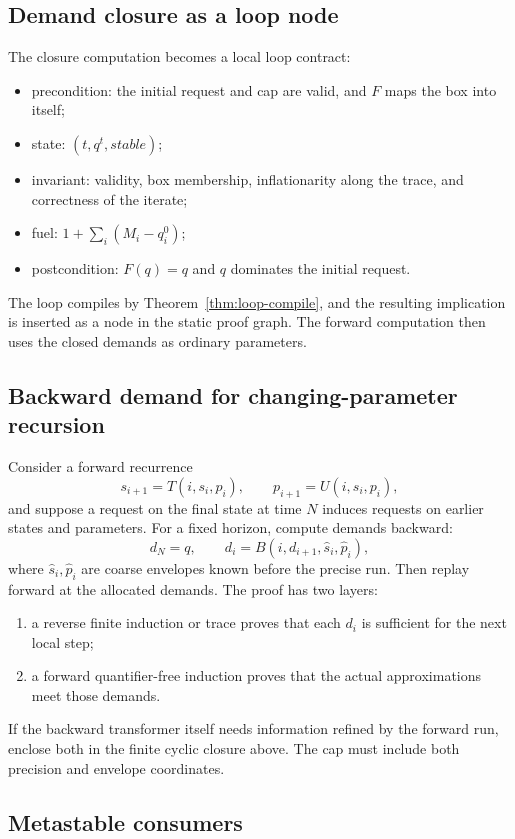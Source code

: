 \subsection{Demand closure as a loop node}

The closure computation becomes a local loop contract:
\begin{itemize}
  \item precondition: the initial request and cap are valid, and \(F\) maps the box into itself;
  \item state: \((t,q^t,\mathit{stable})\);
  \item invariant: validity, box membership, inflationarity along the trace, and correctness of the iterate;
  \item fuel: \(1+\sum_i(M_i-q_i^0)\);
  \item postcondition: \(F(q)=q\) and \(q\) dominates the initial request.
\end{itemize}
The loop compiles by Theorem~\ref{thm:loop-compile}, and the resulting implication is inserted as a node in
the static proof graph.  The forward computation then uses the closed demands as ordinary parameters.

\subsection{Backward demand for changing-parameter recursion}

Consider a forward recurrence
\[
 s_{i+1}=T(i,s_i,p_i),
 \qquad p_{i+1}=U(i,s_i,p_i),
\]
and suppose a request on the final state at time \(N\) induces requests on earlier states and parameters.
For a fixed horizon, compute demands backward:
\[
 d_N=q,
 \qquad d_i=B(i,d_{i+1},\widehat s_i,\widehat p_i),
\]
where \(\widehat s_i,\widehat p_i\) are coarse envelopes known before the precise run.  Then replay forward
at the allocated demands.  The proof has two layers:
\begin{enumerate}
  \item a reverse finite induction or trace proves that each \(d_i\) is sufficient for the next local step;
  \item a forward quantifier-free induction proves that the actual approximations meet those demands.
\end{enumerate}
If the backward transformer itself needs information refined by the forward run, enclose both in the finite
cyclic closure above.  The cap must include both precision and envelope coordinates.

\subsection{Metastable consumers}

